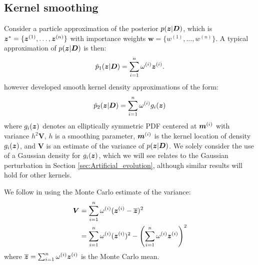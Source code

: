 \subsection{Kernel smoothing} 
\label{sec:Kernel_smoothing}

Consider a particle approximation of the posterior \(p(\boldsymbol{z} | \boldsymbol{D})\), which is \(\boldsymbol{z}^* = \{\boldsymbol{z}^{(1)}, \ldots,
\boldsymbol{z}^{(n)}\}\) with importance weights \(\boldsymbol{w} = \{w^{(1)}, \ldots, w^{(n)}\}\). A typical approximation of
\(p(\boldsymbol{z} | \boldsymbol{D})\) is then:
\begin{align}
\hat{p}_1(\boldsymbol{z} | \boldsymbol{D}) = \sum_{i=1}^{n} \omega^{(i)} \boldsymbol{z}^{(i)}.
\end{align}
\cite{West1993A} however developed smooth kernel density approximations of the form:
\begin{align}
\hat{p}_2(\boldsymbol{z} | \boldsymbol{D}) = \sum_{i=1}^{n} \omega^{(i)} g_i(\boldsymbol{z})
\label{eq:kernelApprox}
\end{align}
where \(g_i(\boldsymbol{z})\) denotes an elliptically symmetric \gls{PDF} centered at \(\boldsymbol{m}^{(i)}\) with variance \(h^2
\boldsymbol{V}\), \(h\) is a smoothing parameter, \(\boldsymbol{m}^{(i)}\) is the kernel location of density \(g_i(\boldsymbol{z})\),
and \(\boldsymbol{V}\) is an estimate of the variance of \(p(\boldsymbol{z} | \boldsymbol{D})\). We solely consider the use of a Gaussian
density for \(g_i(\boldsymbol{z})\), which we will see relates to the Gaussian perturbation in Section
\ref{sec:Artificial_evolution}, although similar results will hold for other kernels.

We follow \cite{West1993A} in using the Monte Carlo estimate of the variance:
\begin{align} 
\label{eq:kernelVariance}
\boldsymbol{V} &= \sum_{i=1}^{n} \omega^{(i)} (\boldsymbol{z}^{(i)} - \overline{\boldsymbol{z}})^2 \notag \\
               &= \sum_{i=1}^{n} \omega^{(i)} (\boldsymbol{z}^{(i)})^2 - \left( \sum_{i=1}^{n} \omega^{(i)} \boldsymbol{z}^{(i)} \right)^2
\end{align}
where \(\overline{\boldsymbol{z}} = \sum_{i=1}^{n} \omega^{(i)} \boldsymbol{z}^{(i)}\) is the Monte Carlo mean. 

